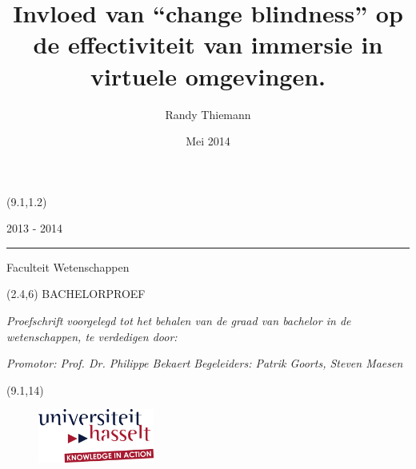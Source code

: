 \documentclass[a4paper,12pt]{report}
\title{Invloed van ``change blindness'' op de effectiviteit van immersie in virtuele omgevingen.}  \let\Title\@title
\author{Randy Thiemann}                        \let\Author\@author
\date{Mei 2014}
\begin{document}

\thispagestyle{empty}

\begin{textblock}{7}(9.1,1.2)
    {\color{uhasselttext} 2013 - 2014 \rule{0.2mm}{2.1mm} }{\color{uhasseltblue} Faculteit Wetenschappen}
\end{textblock}

\begin{textblock}{6.5}(2.4,6)
    \vspace*{1.5cm}
    {\Large\noindent\color{uhasselttext} BACHELORPROEF}\newline
    
    \vspace{1.5cm}
    {\noindent\LARGE\bf\color{uhasseltblue} \Title}\newline
    
    \vspace{1.7cm}
    {\small\color{uhasselttext}\noindent\it Proefschrift voorgelegd tot het behalen van de graad van bachelor in de wetenschappen, te verdedigen door:}\newline
    
    {\noindent\color{uhasselttext}\bf \Author}\newline
    
    {\small\noindent\color{uhasselttext}\it Promotor: Prof. Dr. Philippe Bekaert}\newline
    {\small\noindent\color{uhasselttext}\it Begeleiders: Patrik Goorts, Steven Maesen}
    \vspace{1.5cm}
\end{textblock}

\begin{textblock}{6.5}(9.1,14)
    \begin{figure}[ht]
        \centering
        \includegraphics[width=1.5in]{images/logo_uhasselt}
    \end{figure}
\end{textblock}
\end{document}
